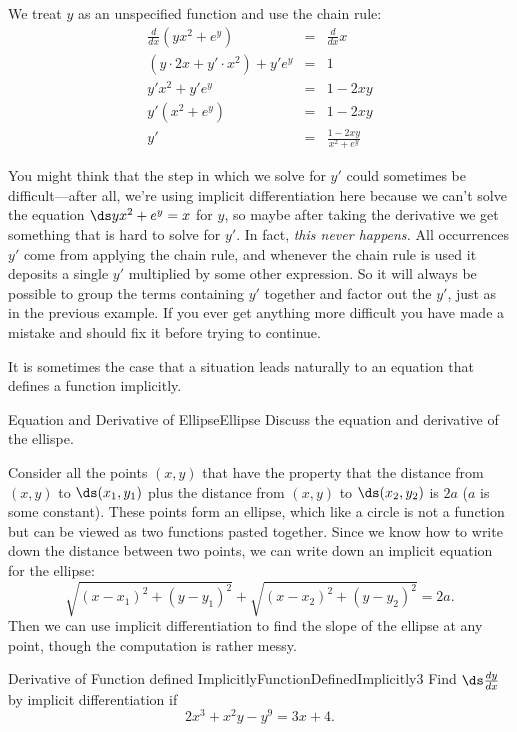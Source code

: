 \begin{solution} 
We treat $y$ as an unspecified function and use the
chain rule:
\begin{eqnarray*}
\frac{d}{dx}(yx^2+e^y)&=&\frac{d}{dx}x\\
(y\cdot 2x+y'\cdot x^2)+y'e^y &=& 1\\
y'x^2+y'e^y&=& 1-2xy\\
y'(x^2+e^y)&=& 1-2xy\\
y'&=&\frac{1-2xy}{x^2+e^y}
\end{eqnarray*}
\end{solution}

You might think that the step in which we solve for $y'$ could
sometimes be difficult---after all, we're using implicit
differentiation here because we can't solve the equation
$\ds yx^2+e^y=x$ for $y$, so maybe after taking the derivative we get
something that is hard to solve for $y'$. In fact, {\it this never
  happens.} All occurrences $y'$ come from applying the chain rule,
and whenever the chain rule is used it deposits a single $y'$
multiplied by some other expression. So it will always be possible to
group the terms containing $y'$ together and factor out the $y'$, just
as in the previous example. If you ever get anything more difficult
you have made a mistake and should fix it before trying to continue.

It is sometimes the case that a situation leads naturally to an
equation that defines a function implicitly. 

\begin{example}{Equation and Derivative of Ellipse}{Ellipse}
Discuss the equation and derivative of the ellispe.
\end{example}

\begin{solution} 
Consider all the points $(x,y)$ that have the property that
the distance from $(x,y)$ to $\ds (x_1,y_1)$ plus the distance 
from $(x,y)$ to $\ds (x_2,y_2)$ is $2a$ ($a$ is some constant). These
points form an ellipse, which like a circle is not a function but can be
viewed as two functions pasted together. Since we know how to write
down the distance between two points, we can write down an implicit
equation for the ellipse:
$$\sqrt{(x-x_1)^2+(y-y_1)^2}+\sqrt{(x-x_2)^2+(y-y_2)^2}=2a.$$
Then we can use implicit differentiation to find the slope of the
ellipse at any point, though the computation is rather messy.
\end{solution}

\begin{example}{Derivative of Function defined Implicitly}{FunctionDefinedImplicitly3}
Find $\ds\frac{dy}{dx}$ by implicit differentiation if
$$2x^3+x^2y-y^9=3x+4.$$
\vspace{-0.5cm}
\end{example}

